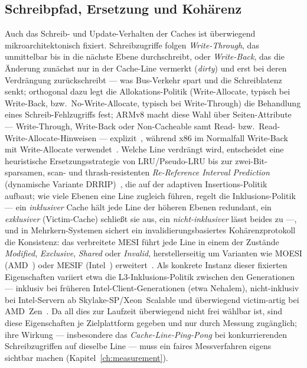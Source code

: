 \begin{nurlang}
\subsection{Schreibpfad, Ersetzung und Kohärenz}\label{subsec:write-coherence}
Auch das Schreib- und Update-Verhalten der Caches ist überwiegend mikroarchitektonisch fixiert.
Schreibzugriffe folgen \emph{Write-Through}, das unmittelbar bis in die nächste Ebene durchschreibt,
oder \emph{Write-Back}, das die Änderung zunächst nur in der Cache-Line vermerkt (\emph{dirty}) und erst
bei deren Verdrängung zurückschreibt --- was Bus-Verkehr spart und die Schreiblatenz senkt; orthogonal
dazu legt die
Allokations-Politik (Write-Allocate, typisch bei Write-Back, bzw.\ No-Write-Allocate, typisch bei
Write-Through) die Behandlung eines Schreib-Fehlzugriffs
fest; ARMv8 macht diese Wahl über Seiten-Attribute --- Write-Through, Write-Back oder Non-Cacheable
samt Read- bzw.\ Read-Write-Allocate-Hinweisen --- explizit~\cite{arm_arm}, während x86 im Normalfall
Write-Back mit Write-Allocate verwendet~\cite{intel_sdm}. Welche Line verdrängt wird, entscheidet eine
heuristische Ersetzungsstrategie von LRU/Pseudo-LRU bis zur zwei-Bit-sparsamen, scan- und
thrash-resistenten \emph{Re-Reference Interval
Prediction} (dynamische Variante DRRIP)~\cite{jaleel2010rrip}, die auf der adaptiven
Insertions-Politik~\cite{qureshi2007adaptive} aufbaut; wie viele Ebenen eine Line zugleich führen, regelt
die Inklusions-Politik --- ein \emph{inklusiver} Cache hält jede Line der höheren Ebenen redundant, ein
\emph{exklusiver} (Victim-Cache) schließt sie aus, ein \emph{nicht-inklusiver} lässt beides zu ---, und
in Mehrkern-Systemen sichert ein invalidierungsbasiertes Kohärenzprotokoll die Konsistenz: das
verbreitete MESI führt jede Line in einem der Zustände \emph{Modified}, \emph{Exclusive}, \emph{Shared}
oder \emph{Invalid}, herstellerseitig um Varianten wie MOESI (AMD~\cite{amd_sog}) oder MESIF
(Intel~\cite{intel_optimization}) erweitert~\cite{hennessy2019architecture}. Als konkrete
Instanz dieser fixierten Eigenschaften variiert etwa die L3-Inklusions-Politik zwischen den Generationen
--- inklusiv bei früheren Intel-Client-Generationen (etwa Nehalem), nicht-inklusiv bei Intel-Servern ab
Skylake-SP/Xeon~Scalable und überwiegend
victim-artig bei AMD~Zen~\cite{intel_optimization,amd_sog}. Da all dies zur Laufzeit überwiegend nicht
frei wählbar ist, sind diese Eigenschaften je Zielplattform gegeben und nur durch Messung zugänglich; ihre
Wirkung --- insbesondere das \emph{Cache-Line-Ping-Pong} bei konkurrierenden Schreibzugriffen auf dieselbe
Line --- muss ein faires Messverfahren eigens sichtbar machen (Kapitel~\ref{ch:measurement}).
\end{nurlang}
